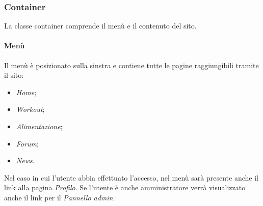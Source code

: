 \subsubsection{Container}
La classe container comprende il menù e il contenuto del sito.
\paragraph{Menù}
Il menù è posizionato sulla sinstra e contiene tutte le pagine raggiungibili tramite il sito:
\begin{itemize}
	\item \textit{Home};
	\item \textit{Workout};
	\item \textit{Alimentazione};
	\item \textit{Forum};
	\item \textit{News}.
\end{itemize}
Nel caso in cui l'utente abbia effettuato l'accesso, nel menù sarà presente anche il link alla pagina \textit{Profilo}. Se l'utente è anche amministratore verrà visualizzato anche il link per il \textit{Pannello admin}.
